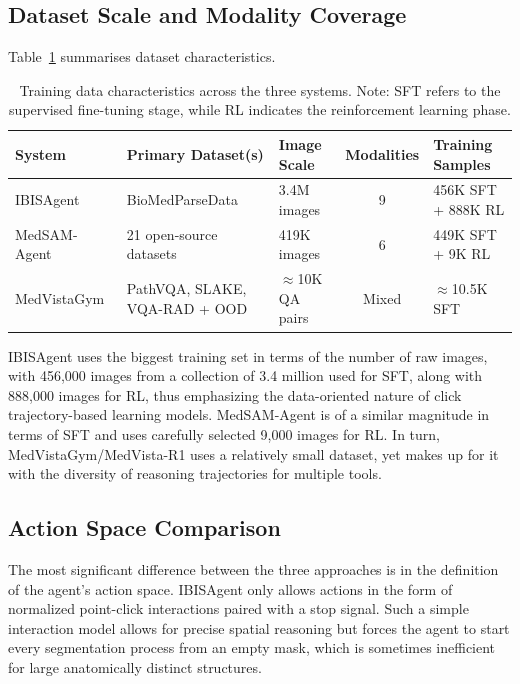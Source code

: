 \documentclass[12pt, a4paper]{article}
\begin{document}
\FloatBarrier

\subsection{Dataset Scale and Modality Coverage}

Table~\ref{tab:datasets} summarises dataset characteristics.

\begin{table}[htbp]
\centering
\caption{Training data characteristics across the three systems.
Note: SFT refers to the supervised fine-tuning stage, while RL indicates the
reinforcement learning phase.}
\label{tab:datasets}
\renewcommand{\arraystretch}{1.25}
\footnotesize
\begin{tabular}{@{}p{2.8cm}p{4cm}p{1.9cm}cp{3cm}@{}}
\toprule
\textbf{System} & \textbf{Primary Dataset(s)} & \textbf{Image Scale}
& \textbf{Modalities} & \textbf{Training Samples} \\
\midrule
IBISAgent~\cite{ibisagent}
  & BioMedParseData~\cite{biomedparse} & 3.4M images & 9 & 456K SFT + 888K RL \\
MedSAM-Agent~\cite{medsam_agent}
  & 21 open-source datasets & 419K images & 6 & 449K SFT + 9K RL \\
MedVistaGym~\cite{medvistagym}
  & PathVQA, SLAKE, VQA-RAD + OOD & $\approx$10K QA pairs & Mixed & $\approx$10.5K SFT \\
\bottomrule
\end{tabular}
\end{table}

IBISAgent uses the biggest training set in terms of the number of raw images, with
456,000 images from a collection of 3.4 million used for SFT, along with 888,000 images
for RL, thus emphasizing the data-oriented nature of click trajectory-based learning
models.
MedSAM-Agent is of a similar magnitude in terms of SFT and uses carefully selected
9,000 images for RL.
In turn, MedVistaGym/MedVista-R1 uses a relatively small dataset, yet makes up for it
with the diversity of reasoning trajectories for multiple tools.

\subsection{Action Space Comparison}

The most significant difference between the three approaches is in the definition of
the agent's action space.
IBISAgent only allows actions in the form of normalized point-click interactions paired
with a stop signal.
Such a simple interaction model allows for precise spatial reasoning but forces the
agent to start every segmentation process from an empty mask, which is sometimes
inefficient for large anatomically distinct structures.
\end{document}
